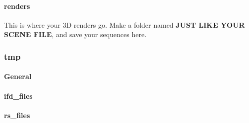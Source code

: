 \paragraph{renders}
This is where your 3D renders go. Make a folder named \textbf{JUST LIKE YOUR SCENE FILE}, and save your sequences here. 


\subsubsection{tmp}
\paragraph{General}
\paragraph{ifd\_files}
\paragraph{rs\_files}

